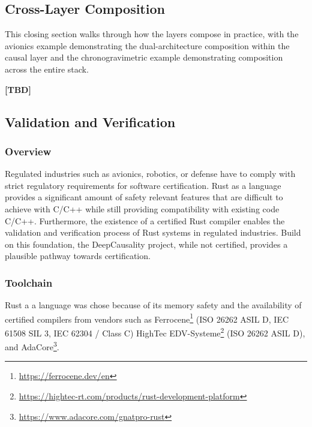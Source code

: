  
\subsection{Cross-Layer Composition}
\label{sec:implementation_composition}
 
This closing section walks through how the layers compose in practice, with the avionics example demonstrating the dual-architecture composition within the causal layer and the chronogravimetric example demonstrating composition across the entire stack.
 
\textbf{[TBD]}
 

\subsection{Validation and Verification}
\label{sec:implementation_validation}

\subsubsection{Overview}

Regulated industries such as avionics, robotics, or defense have to comply with strict regulatory requirements for software certification. Rust as a language provides a significant amount of safety relevant features that are difficult to achieve with C/C++ while still providing compatibility with existing code C/C++. Furthermore, the existence of a certified Rust compiler enables the validation and verification process of Rust systems in regulated industries. Build on this foundation, the DeepCausality project, while not certified, provides a plausible pathway towards certification. 

\subsubsection{Toolchain}

Rust a a language was chose because of its memory safety and the availability of certified compilers from vendors such
as Ferrocene\footnote{\url{https://ferrocene.dev/en}} (ISO 26262 ASIL D, IEC 61508 SIL 3, IEC 62304 / Class C) HighTec EDV-Systeme\footnote{\url{https://hightec-rt.com/products/rust-development-platform}} (ISO 26262 ASIL D), and AdaCore\footnote{\url{https://www.adacore.com/gnatpro-rust}}. 

